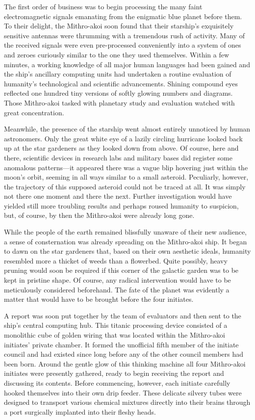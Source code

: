 \documentclass[12pt]{article}
\begin{document}
The first order of business was to begin processing the many faint electromagnetic signals emanating from the enigmatic blue planet before them.
To their delight, the Mithro-akoi soon found that their starship's exquisitely sensitive antennas were thrumming with a tremendous rush of activity.
Many of the received signals were even pre-processed conveniently into a system of ones and zeroes curiously similar to the one they used themselves.
Within a few minutes, a working knowledge of all major human languages had been gained and the ship's ancillary computing units had undertaken a routine evaluation of humanity's technological and scientific advancements.
Shining compound eyes reflected one hundred tiny versions of softly glowing numbers and diagrams. 
Those Mithro-akoi tasked with planetary study and evaluation watched with great concentration.

Meanwhile, the presence of the starship went almost entirely unnoticed by human astronomers.
Only the great white eye of a lazily circling hurricane looked back up at the star gardeners as they looked down from above.
Of course, here and there, scientific devices in research labs and military bases did register some anomalous patterns---it appeared there was a vague blip hovering just within the moon's orbit, 
seeming in all ways similar to a small asteroid. 
Peculiarly, however, the trajectory of this supposed asteroid could not be traced at all.
It was simply not there one moment and there the next.
Further investigation would have yielded still more troubling results
and perhaps roused humanity to suspicion, 
but, of course, by then the Mithro-akoi were already long gone.

While the people of the earth remained blissfully unaware of their new audience,
a sense of consternation was already spreading on the Mithro-akoi ship.
It began to dawn on the star gardeners that,
based on their own aesthetic ideals,
humanity resembled more a thicket of weeds than a flowerbed.
Quite possibly, heavy pruning would soon be required if this corner of the galactic garden was to be kept in pristine shape.
Of course, any radical intervention would have to be meticulously considered beforehand.
The fate of the planet was evidently a matter that would have to be brought before the four initiates.

A report was soon put together by the team of evaluators and then sent to the ship's central computing hub.
This titanic processing device consisted of a monolithic cube of golden wiring that was located within the Mithro-akoi initiates' private chamber.
It formed the unofficial fifth member of the initiate council and had existed since long before any of the other council members had been born.
Around the gentle glow of this thinking machine all four Mithro-akoi initiates were presently gathered, ready to begin receiving the report and discussing its contents.
Before commencing, however, each initiate carefully hooked themselves into their own drip feeder.
These delicate silvery tubes were designed to transport various chemical mixtures directly into their brains through a port surgically implanted into their fleshy heads.
\end{document}

